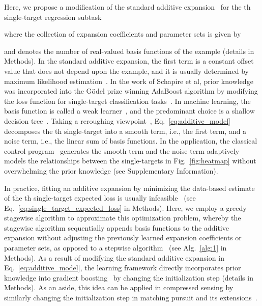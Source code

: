 \documentclass[aps,twocolumn,superscriptaddress,floatfix,preprintnumbers,showkeys]{revtex4}
\begin{document}
Here, we propose a modification of the standard additive expansion~\cite{Friedman_2001, Friedman_2003, Hastie_2009, He_2014, Chen_2016, Ke_2017} for the th single-target regression subtask 

where the collection of expansion coefficients  and parameter sets  is given by

and  denotes the number of real-valued basis functions  of the example  (details in Methods). In the standard additive expansion, the first term is a constant offset value that does not depend upon the example, and it is usually determined by maximum likelihood estimation~\cite{Hastie_1990, Friedman_2000, Friedman_2001, Friedman_2003, Hastie_2009}. In the work of Schapire et al, prior knowledge was incorporated into the G\"{o}del prize winning AdaBoost algorithm by modifying the loss function for single-target classification tasks~\cite{Schapire_2002}. In machine learning, the basis function is called a weak learner~\cite{Kearns_1988, Schapire_1990, Kearns_1994_3, Freund_1995, Breiman_1997_1, Freund_1997, Schapire_2002}, and the predominant choice is a shallow decision tree~\cite{Friedman_2001, Friedman_2003, Hastie_2009, He_2014, Chen_2016, Ke_2017}. Taking a reroughing viewpoint~\cite{Tukey_1977}, Eq.~\ref{eq:additive_model} decomposes the th single-target into a smooth term, i.e., the first term, and a noise term, i.e., the linear sum of basis functions. In the application, the classical control program~\cite{Roushan_2017, Neill_2018, Chiaro_2019} generates the smooth term and the noise term adaptively models the relationships between the single-targets in Fig.~\ref{fig:heatmap} without overwhelming the prior knowledge (see Supplementary Information).

In practice, fitting an additive expansion by minimizing the data-based estimate of the th single-target expected loss is usually infeasible~\cite{Mallat_1993, Friedman_2000, Friedman_2001, Vincent_2002, Friedman_2003, Hastie_2009, Donoho_2012} (see Eq.~\ref{eq:single_target_expected_loss} in Methods). Here, we employ a greedy stagewise algorithm to approximate this optimization problem, whereby the stagewise algorithm sequentially appends basis functions to the additive expansion without adjusting the previously learned expansion coefficients or parameter sets, as opposed to a stepwise algorithm~\cite{Mallat_1993, Friedman_2000, Friedman_2001, Vincent_2002, Friedman_2003, Hastie_2009, Donoho_2012} (see Alg.~\ref{alg:1} in Methods). As a result of modifying the standard additive expansion in Eq.~\ref{eq:additive_model}, the learning framework directly incorporates prior knowledge into gradient boosting~\cite{Friedman_2001, Friedman_2003, Hastie_2009, He_2014, Chen_2016, Ke_2017} by changing the initialization step (details in Methods). As an aside, this idea can be applied in compressed sensing by similarly changing the initialization step in matching pursuit and its extensions~\cite{Mallat_1993, Vincent_2002, Donoho_2012}. 
\end{document}
